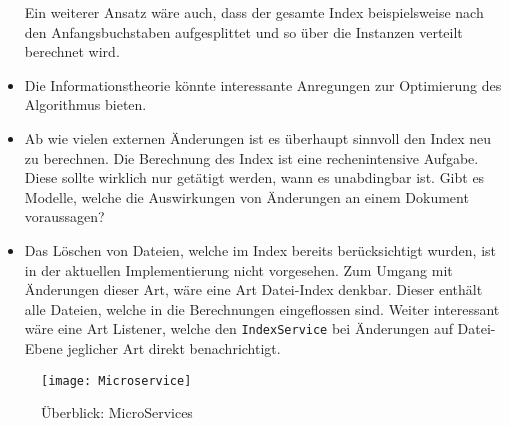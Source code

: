 \begin{itemize}
    Ein weiterer Ansatz wäre auch, dass der gesamte Index beispielsweise nach den Anfangsbuchstaben aufgesplittet und so über die Instanzen verteilt berechnet wird.%
    \item Die Informationstheorie könnte interessante Anregungen zur Optimierung des Algorithmus bieten.%
    \item Ab wie vielen externen Änderungen ist es überhaupt sinnvoll den Index neu zu berechnen. Die Berechnung des Index ist eine rechenintensive Aufgabe. Diese sollte wirklich nur getätigt werden, wann es unabdingbar ist. Gibt es Modelle, welche die Auswirkungen von Änderungen an einem Dokument voraussagen?
    \item Das Löschen von Dateien, welche im Index bereits berücksichtigt wurden, ist in der aktuellen Implementierung nicht vorgesehen. Zum Umgang mit Änderungen dieser Art, wäre eine Art Datei-Index denkbar. Dieser enthält alle Dateien, welche in die Berechnungen eingeflossen sind. Weiter interessant wäre eine Art Listener, welche den \texttt{IndexService} bei Änderungen auf Datei-Ebene jeglicher Art direkt benachrichtigt.%
\end{itemize}



    \begin{figure}[H]
    \centering
    \texttt{[image: Microservice]}
    \caption{Überblick: MicroServices}
    \label{fig:micro-services}
    \end{figure}

